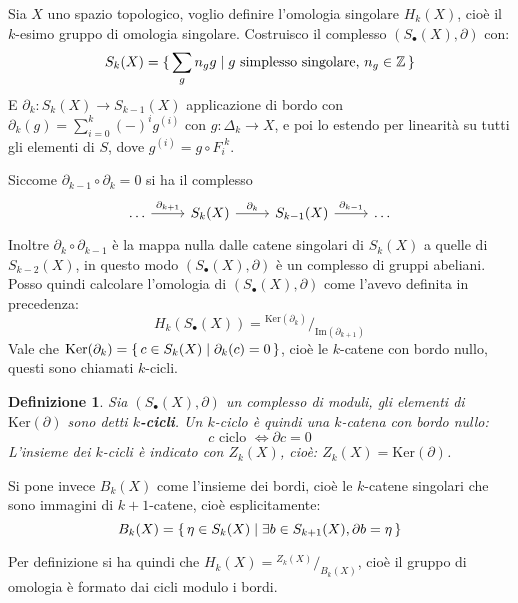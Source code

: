 \documentclass[10pt, twoside=false, x11names]{scrbook}
\newtheorem{definition}[theorem]{Definizione}
\newcommand{\Z}{\mathbb{Z}}
\newcommand{\im}[1]{\mathrm{Im}( #1 )}
\renewcommand{\ker}[1]{\mathrm{Ker}( #1)}
\newcommand*\quot[2]{{^{\textstyle #1}\big/_{\textstyle #2}}}
\begin{document}


Sia $ X $ uno spazio topologico, voglio definire l'omologia singolare $ H_k(X) $, cioè il $ k $-esimo gruppo di omologia
singolare. Costruisco il complesso $ (S_\bullet(X), \partial) $ con:
\[
  S_k(X) = \set{ \sum_g n_g g | g \text{ simplesso singolare, } n_g \in \Z }
\]
E $ \partial_k : S_k(X) \to S_{k-1}(X) $ applicazione di bordo con $ \partial_k(g) = \sum_{i=0}^k(-)^ig^{(i)} $ con $ g: \Delta_k \to X $, e poi lo estendo per
linearità su tutti gli elementi di $ S $, dove $ g^{(i)} = g \circ F_i^{\; k} $.

Siccome $ \partial_{k-1} \circ \partial_k = 0 $ si ha il complesso
\[
  \begin{tikzcd}
   \dots \arrow{r}{\partial_{k+1}} & S_k(X) \arrow{r}{\partial_k} & S_{k-1}(X) \arrow{r}{\partial_{k-1}} & \dots
  \end{tikzcd}
\]
Inoltre $ \partial_k \circ \partial_{k-1} $ è la mappa nulla dalle catene singolari di $ S_k(X) $
a quelle di $ S_{k-2}(X) $, in questo modo $ (S_\bullet(X), \partial) $ è un complesso di gruppi abeliani.
Posso quindi calcolare l'omologia di $ (S_\bullet(X),\partial) $ come l'avevo definita
in precedenza:
\[
  H_k(S_\bullet(X)) = \quot{\ker{\partial_k}}{\im{\partial_{k+1}}}
\]
Vale che $ \ker{\partial_k} = \set{c \in S_k(X) | \partial_k(c) = 0} $, cioè le $ k $-catene con
bordo nullo, questi sono chiamati $ k $-cicli.

\begin{definition}
  Sia $ (S_\bullet(X),\partial) $ un complesso di moduli, gli elementi di $ \ker{\partial} $ sono detti
  \textbf{$ k $-cicli}. Un $ k $-ciclo è quindi una $ k $-catena
  con bordo nullo:
  \[
    c \text{ ciclo } \Leftrightarrow \partial c = 0
  \]
  L'insieme dei $ k $-cicli è indicato con $ Z_k(X) $, cioè: $ Z_k(X) = \ker{\partial} $.
\end{definition}

Si pone invece $ B_k(X) $ come l'insieme dei bordi, cioè le $ k $-catene singolari
che sono immagini di $ k+1 $-catene, cioè esplicitamente:
\[
  B_k(X) = \set{\eta \in S_k(X) | \exists b \in S_{k+1}(X), \partial b = \eta}
\]

Per definizione si ha quindi che $ H_k(X) = \quot{Z_k(X)}{B_k(X)} $, cioè il gruppo
di omologia è formato dai cicli modulo i bordi.
\end{document}
